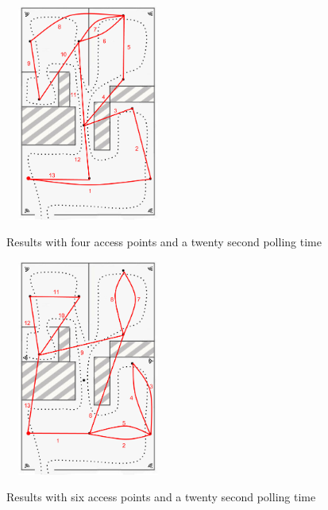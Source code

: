 \begin{figure}
	\centering
	\begin{minipage}{0.45\textwidth}
		\ \includegraphics[width=2in,height=2.8in]{loc1_4ap_20s.png}
		\caption{Results with four access points and a twenty second polling time}
		\label{loc1_4ap_20s}
	\end{minipage}\hfill
	\begin{minipage}{0.45\textwidth}
		\centering
		\ \includegraphics[width=2in,height=2.8in]{loc1_6ap_20s.png}
		\caption{Results with six access points and a twenty second polling time}
		\label{loc1_6ap_20s}
	\end{minipage}
\end{figure}

